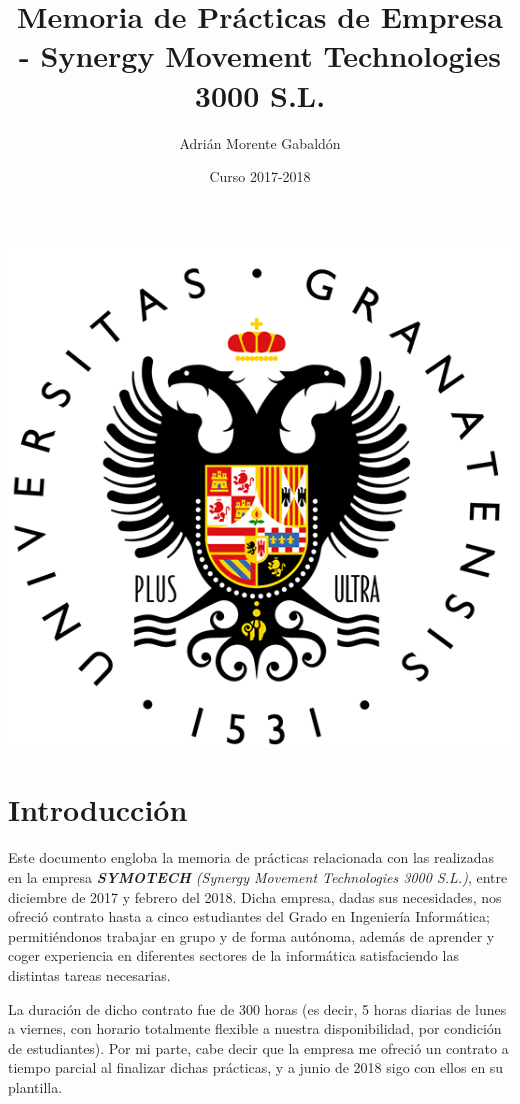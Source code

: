 \documentclass[13pt]{scrartcl}
\title{Memoria de Prácticas de Empresa - Synergy Movement Technologies 3000 S.L.}
\author{Adrián Morente Gabaldón}
\date{Curso 2017-2018}
\begin{document}
	\maketitle
	
	\begin{center}
		\includegraphics[scale=0.5]{images/logougr.png}
	\end{center}
	
	\newpage
	\tableofcontents
	\newpage
	
	\section{Introducción}
		Este documento engloba la memoria de prácticas relacionada con las realizadas en la empresa \textit{\textbf{SYMOTECH} (Synergy Movement Technologies 3000 S.L.)}, entre diciembre de 2017 y febrero del 2018. Dicha empresa, dadas sus necesidades, nos ofreció contrato hasta a cinco estudiantes del Grado en Ingeniería Informática; permitiéndonos trabajar en grupo y de forma autónoma, además de aprender y coger experiencia en diferentes sectores de la informática satisfaciendo las distintas tareas necesarias.
		
		La duración de dicho contrato fue de 300 horas (es decir, 5 horas diarias de lunes a viernes, con horario totalmente flexible a nuestra disponibilidad, por condición de estudiantes). Por mi parte, cabe decir que la empresa me ofreció un contrato a tiempo parcial al finalizar dichas prácticas, y a junio de 2018 sigo con ellos en su plantilla.
	
\end{document}
